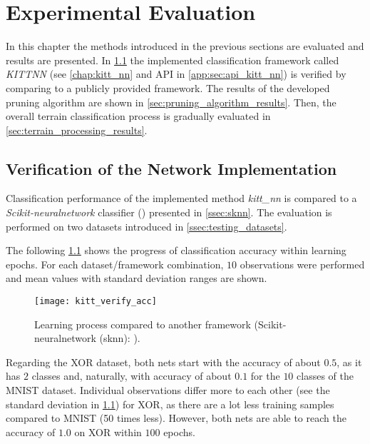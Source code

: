 \chapter{Experimental Evaluation} \label{chap:results}
In this chapter the methods introduced in the previous sections are evaluated and results are presented. In \cref{sec:verification_of_nn} the implemented classification framework called \textit{KITTNN} (see \cref{chap:kitt_nn} and API in \cref{app:sec:api_kitt_nn}) is verified by comparing to a publicly provided framework. The results of the developed pruning algorithm are shown in \cref{sec:pruning_algorithm_results}. Then, the overall terrain classification process is gradually evaluated in \cref{sec:terrain_processing_results}.

\section{Verification of the Network Implementation} \label{sec:verification_of_nn}
Classification performance of the implemented method \textit{kitt\_nn} is compared to a \textit{Scikit-neuralnetwork} classifier (\citep{misc:sknn}) presented in \cref{ssec:sknn}. The evaluation is performed on two datasets introduced in \cref{ssec:testing_datasets}.

The following \cref{fig:kitt_verify_acc} shows the progress of classification accuracy within learning epochs. For each dataset/framework combination, $ 10 $ observations were performed and mean values with standard deviation ranges are shown.

\begin{figure}[H]
  \centering
  \texttt{[image: kitt\_verify\_acc]}
  \caption{Learning process compared to another framework (Scikit-neuralnetwork (sknn): \citep{misc:sknn}).}
  \label{fig:kitt_verify_acc}
\end{figure}

Regarding the XOR dataset, both nets start with the accuracy of about $ 0.5 $, as it has $ 2 $ classes and, naturally, with accuracy of about $ 0.1 $ for the $ 10 $ classes of the MNIST dataset. Individual observations differ more to each other (see the standard deviation in \cref{fig:kitt_verify_acc}) for XOR, as there are a lot less training samples compared to MNIST (50 times less). However, both nets are able to reach the accuracy of $ 1.0 $ on XOR within $ 100 $ epochs.


